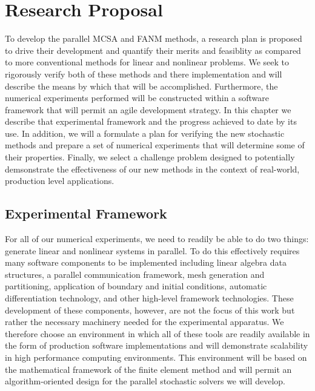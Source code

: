 \chapter{Research Proposal}
\label{ch:research_proposal}
To develop the parallel MCSA and FANM methods, a research plan is
proposed to drive their development and quantify their merits and
feasiblity as compared to more conventional methods for linear and
nonlinear problems. We seek to rigorously verify both of these methods
and there implementation and will describe the means by which that
will be accomplished. Furthermore, the numerical experiments performed
will be constructed within a software framework that will permit an
agile development strategy. In this chapter we describe that
experimental framework and the progress achieved to date by its
use. In addition, we will a formulate a plan for verifying the new
stochastic methods and prepare a set of numerical experiments that
will determine some of their properties. Finally, we select a
challenge problem designed to potentially demsonstrate the
effectiveness of our new methods in the context of real-world,
production level applications.

\section{Experimental Framework}
\label{sec:experimental_framework}
For all of our numerical experiments, we need to readily be able to do
two things: generate linear and nonlinear systems in parallel. To do
this effectively requires many software components to be implemented
including linear algebra data structures, a parallel communication
framework, mesh generation and partitioning, application of boundary
and initial conditions, automatic differentiation technology, and
other high-level framework technologies. These development of these
components, however, are not the focus of this work but rather the
necessary machinery needed for the experimental apparatus. We
therefore choose an environment in which all of these tools are
readily available in the form of production software implementations
and will demonstrate scalability in high performance computing
environments. This environment will be based on the mathematical
framework of the finite element method and will permit an
algorithm-oriented design for the parallel stochastic solvers we will
develop.

